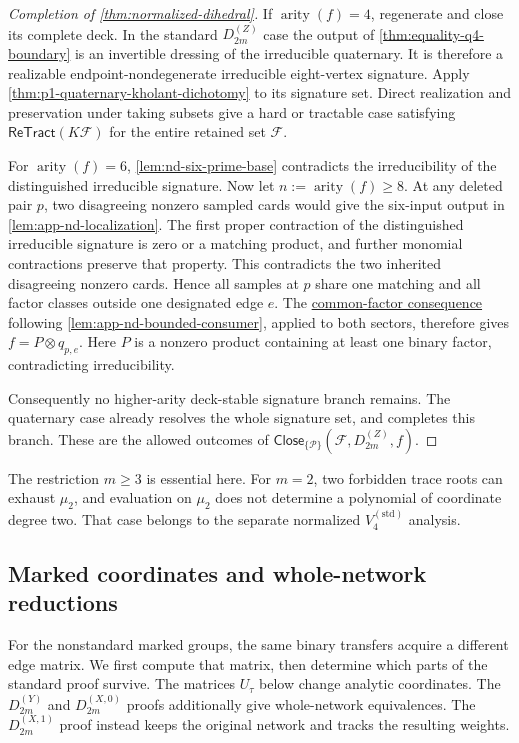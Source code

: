 \documentclass[11pt,letterpaper,onecolumn]{article}
\theoremstyle{plain}
\theoremstyle{definition}
\theoremstyle{remark}
\newcommand{\cF}{\mathcal F}
\newcommand{\cP}{\mathscr P}
\newcommand{\ReTract}{\mathsf{ReTract}}
\newcommand{\DihZ}[1]{{D_{#1}^{(Z)}}}
\newcommand{\DihY}[1]{{D_{#1}^{(Y)}}}
\newcommand{\DihXzero}[1]{{D_{#1}^{(X,0)}}}
\newcommand{\DihXone}[1]{{D_{#1}^{(X,1)}}}
\newcommand{\KleinStd}{{V_4^{(\mathrm{std})}}}
\newcommand{\Close}{\mathsf{Close}}
\newcommand{\arity}{\operatorname{arity}}
\begin{document}
\begin{proof}[Completion of \cref{thm:normalized-dihedral}]
If \(\arity(f)=4\), regenerate and close its complete deck.
In the standard \(\DihZ{2m}\) case the output of
\cref{thm:equality-q4-boundary} is an invertible dressing of the irreducible
quaternary.  It is therefore a realizable endpoint-nondegenerate irreducible
eight-vertex signature.  Apply
\cref{thm:p1-quaternary-kholant-dichotomy} to its signature set.
Direct realization and preservation under taking subsets give a hard or
tractable case satisfying \(\ReTract(K\cF)\) for the entire retained set \(\cF\).

For \(\arity(f)=6\), \cref{lem:nd-six-prime-base} contradicts the
irreducibility of the distinguished irreducible signature.  Now let \(n:=\arity(f)\ge8\).
At any deleted pair \(p\), two disagreeing nonzero sampled cards would
give the six-input output in \cref{lem:app-nd-localization}.  The first
proper contraction of the distinguished irreducible signature is zero or a matching product, and
further monomial contractions preserve that property.  This contradicts
the two inherited disagreeing nonzero cards.  Hence all samples at \(p\)
share one matching and all factor classes outside one designated edge \(e\).
The \hyperref[par:nd-common-factor-consequence]{common-factor consequence}
following \cref{lem:app-nd-bounded-consumer}, applied to both sectors,
therefore gives \(f=P\otimes q_{p,e}\). Here \(P\) is a nonzero product
containing at least one binary factor, contradicting irreducibility.

Consequently no higher-arity deck-stable signature branch remains.  The quaternary
case already resolves the whole signature set, and completes this branch. These are the allowed outcomes of
\(\Close_{\{\cP\}}(\cF,\DihZ{2m},f)\).
\end{proof}

The restriction \(m\ge3\) is essential here.  For \(m=2\), two forbidden
trace roots can exhaust \(\mu_2\), and evaluation on \(\mu_2\) does not
determine a polynomial of coordinate degree two.  That case belongs to the
separate normalized \(\KleinStd\) analysis.


\subsection{Marked coordinates and whole-network reductions}
\label{sec:marked-dihedral-sectors}

For the nonstandard marked groups, the same binary transfers acquire a
different edge matrix.  We first compute that matrix, then determine
which parts of the standard proof survive.  The matrices \(U_\tau\)
below change analytic coordinates.  The \(\DihY{2m}\) and
\(\DihXzero{2m}\) proofs additionally give whole-network
equivalences. The \(\DihXone{2m}\) proof instead keeps the original
network and tracks the resulting weights.
\end{document}
